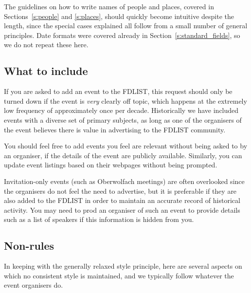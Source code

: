 \documentclass[12pt]{scrartcl}
\theoremstyle{definition}
\begin{document}
The guidelines on how to write names of people and places, covered in Sections~\ref{s:people} and \ref{s:places}, should quickly become intuitive despite the length, since the special cases explained all follow from a small number of general principles.
Date formats were covered already in Section~\ref{s:standard_fields}, so we do not repeat these here.

\subsection{What to include}
If you are asked to add an event to the FDLIST, this request should only be turned down if the event is \emph{very} clearly off topic, which happens at the extremely low frequency of approximately once per decade.
Historically we have included events with a diverse set of primary subjects, as long as one of the organisers of the event believes there is value in advertising to the FDLIST community.

You should feel free to add events you feel are relevant without being asked to by an organiser, if the details of the event are publicly available. Similarly, you can update event listings based on their webpages without being prompted.

Invitation-only events (such as Oberwolfach meetings) are often overlooked since the organisers do not feel the need to advertise, but it is preferable if they are also added to the FDLIST in order to maintain an accurate record of historical activity.
You may need to prod an organiser of such an event to provide details such as a list of speakers if this information is hidden from you.

\subsection{Non-rules}
\label{s:non-rules}
In keeping with the generally relaxed style principle, here are several aspects on which no consistent style is maintained, and we typically follow whatever the event organisers do.
\end{document}

